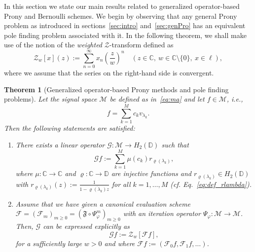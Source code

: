 \documentclass{arxiv}
\newcommand{\funF}{\mathfrak{F}}
\newcommand{\cM}{\mathcal{M}}
\newtheorem{theorem}{Theorem}[section]
\begin{document}
In this section we state our main results related to generalized operator-based Prony and Bernoulli schemes. We begin by observing that any general Prony problem as introduced in sections~\ref{sec:intro} and~\ref{sec:genPro} has an equivalent pole finding problem associated with it. In the following theorem, we shall make use of the notion of the \emph{weighted} $\mathcal{Z}$-transform defined as
\begin{equation}
    \label{eq:zw}
    \mathcal{Z}_{w} [x](z) := \sum_{n=0}^{\infty} x_n  \left( \frac{z}{w} \right)^n \quad (z \in \mathbb{C}, \ w \in \mathbb{C} \setminus\{0\}, \ x \in \ell), 
\end{equation}
where we assume that the series on the right-hand side is convergent.
\begin{theorem}[Generalized operator-based Prony methods and pole finding problems]
\label{thm:ratpron}
    Let the signal space $\cM$ be defined as  in~\eqref{eq:ma} and let $f \in \cM$, i.e.,
    \begin{equation*}
        f = \sum_{k=1}^{M} c_k v_{\lambda_k}.
    \end{equation*}
   Then the following statements are satisfied:
    \begin{enumerate}[label = \alph*)]
    \item There exists a linear operator $\mathcal{G} : \cM \to H_2(\mathbb{D})$ such that
    \begin{equation}
        \label{eq:G}
        \mathcal{G}f := \sum_{k=1}^{M} \mu(c_k) r_{\varrho(\lambda_k)}, 
    \end{equation}
    where $\mu : \mathbb{C} \to \mathbb{C}$ and $\varrho: \mathbb{C} \to \mathbb{D}$ are injective functions and $r_{\varrho(\lambda_k)} \in H_2(\mathbb{D})$ with  $r_{\varrho(\lambda_k)}(z) := \frac{1}{1-\overline{\varrho(\lambda_k)}z}$ for all $k=1,\ldots,M$ (cf. Eq.~\eqref{eq:def_rlambda}).
    \item Assume that we have given a canonical evaluation scheme $\mathcal{F} = {(\mathcal{F}_m)}_{m \ge 0} = {(\funF \circ \Psi_\varphi^m)}_{m \ge 0}$ with an iteration operator $\Psi_\varphi:\cM \to\cM$. Then, $\mathcal{G}$ can be expressed explicitly as
    $$
        \mathcal{G}f := \mathcal{Z}_w[\mathcal{F}f],
    $$
    for a sufficiently large $w > 0$ and where $\mathcal{F}f:=(\mathcal{F}_0f,\mathcal{F}_1f,\ldots)$.
    \end{enumerate}
\end{theorem}
\end{document}
